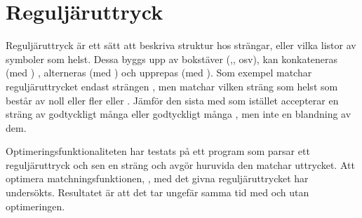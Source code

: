 \documentclass[Rapport]{subfiles}
\begin{document}

\section{Reguljäruttryck}

Reguljäruttryck är ett sätt att beskriva struktur hos strängar, eller vilka
listor av symboler som helst. Dessa byggs upp av bokstäver
(,, osv), 
kan konkateneras (med ) 
, alterneras (med \ic{|})
 och upprepas (med \ic{*}). 
Som exempel matchar reguljäruttrycket  endast strängen ,
men  matchar vilken sträng som helst som består av noll eller fler
 eller . Jämför den sista med  som istället accepterar
en sträng av godtyckligt många  eller godtyckligt många , men inte 
en blandning av dem.

Optimeringsfunktionaliteten har testats på ett program som parsar ett reguljäruttryck
och sen en sträng och avgör huruvida den matchar uttrycket. Att optimera 
matchningsfunktionen, , med det givna
reguljäruttrycket har undersökts. Resultatet är att det tar ungefär samma
tid med och utan optimeringen. 
\end{document}
